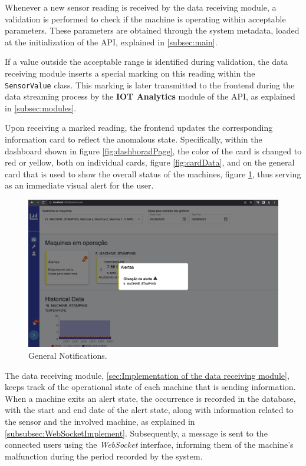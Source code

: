 Whenever a new sensor reading is received by the data receiving module, a validation is performed to check if the machine is operating within acceptable parameters. These parameters are obtained through the system metadata, loaded at the initialization of the \gls{API}, explained in \ref{subsec:main}.

If a value outside the acceptable range is identified during validation, the data receiving module inserts a special marking on this reading within the \texttt{SensorValue} class. This marking is later transmitted to the frontend during the data streaming process by the \textbf{IOT Analytics} module of the \gls{API}, as explained in \ref{subsec:modules}.

Upon receiving a marked reading, the frontend updates the corresponding information card to reflect the anomalous state. Specifically, within the dashboard shown in figure \ref{fig:dashboradPage}, the color of the card is changed to red or yellow, both on individual cards, figure \ref{fig:cardData}, and on the general card that is used to show the overall status of the machines, figure \ref{fig:geralMachineAlert}, thus serving as an immediate visual alert for the user.

\begin{figure}[htbp]
	\centering
	\includegraphics[scale=0.2]{images/geralMachineAlert.png}
	\caption{General Notifications.}
	\label{fig:geralMachineAlert}
\end{figure}

The data receiving module, \ref{sec:Implementation of the data receiving module}, keeps track of the operational state of each machine that is sending information. When a machine exits an alert state, the occurrence is recorded in the database, with the start and end date of the alert state, along with information related to the sensor and the involved machine, as explained in \ref{subsubsec:WebSocketImplement}. Subsequently, a message is sent to the connected users using the \textit{WebSocket} interface, informing them of the machine's malfunction during the period recorded by the system.

